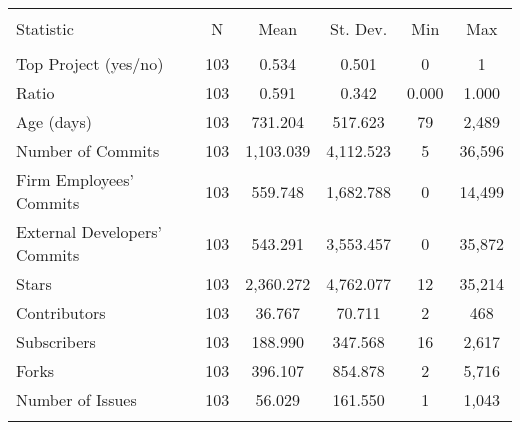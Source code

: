 \begin{tabular}{@{\extracolsep{5pt}}lccccc}
\\[-1.8ex]\hline
\hline \\[-1.8ex]
Statistic & \multicolumn{1}{c}{N} & \multicolumn{1}{c}{Mean} & \multicolumn{1}{c}{St. Dev.} & \multicolumn{1}{c}{Min} & \multicolumn{1}{c}{Max} \\
\hline \\[-1.8ex]
Top Project (yes/no) & 103 & 0.534 & 0.501 & 0 & 1 \\
Ratio & 103 & 0.591 & 0.342 & 0.000 & 1.000 \\
Age (days) & 103 & 731.204 & 517.623 & 79 & 2,489 \\
Number of Commits & 103 & 1,103.039 & 4,112.523 & 5 & 36,596 \\ 
Firm Employees' Commits & 103 & 559.748 & 1,682.788 & 0 & 14,499 \\
External Developers' Commits & 103 & 543.291 & 3,553.457 & 0 & 35,872 \\
Stars & 103 & 2,360.272 & 4,762.077 & 12 & 35,214 \\
Contributors & 103 & 36.767 & 70.711 & 2 & 468 \\
Subscribers & 103 & 188.990 & 347.568 & 16 & 2,617 \\
Forks & 103 & 396.107 & 854.878 & 2 & 5,716 \\
Number of Issues & 103 & 56.029 & 161.550 & 1 & 1,043 \\
\hline \\[-1.8ex]
\end{tabular}

